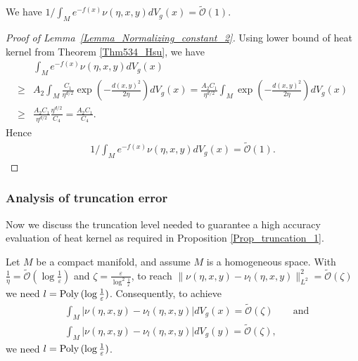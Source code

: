 \begin{lemma}\label{Lemma_Normalizing_constant_2}
    We have $1/\int_{M} e^{-f(x)}\nu(\eta, x, y) dV_{g}(x) = \tilde{\mathcal{O}}(1)$.
\end{lemma}
\begin{proof}[Proof of Lemma~\ref{Lemma_Normalizing_constant_2}]
    Using lower bound of heat kernel  from Theorem \ref{Thm534_Hsu}, we have 
    \begin{align*}
            &\int_{M} e^{-f(x)}\nu(\eta, x, y) dV_{g}(x) \\
            \ge& A_{2} \int_{M} \frac{C_{1}}{\eta^{d/2}} \exp(-\frac{d(x, y)^{2}}{2\eta}) dV_{g}(x) 
            = \frac{A_{2}C_{1}}{\eta^{d/2}} \int_{M} \exp(-\frac{d(x, y)^{2}}{2\eta}) dV_{g}(x)  \\
            \ge& \frac{A_{2}C_{1}}{\eta^{d/2}} \frac{\eta^{d/2}}{C_{4}}
            = \frac{A_{2}C_{1}}{C_{4}}.
    \end{align*}
    Hence
    \begin{align*}
        1/\int_{M} e^{-f(x)}\nu(\eta, x, y) dV_{g}(x) = \tilde{\mathcal{O}}(1).
    \end{align*}
\end{proof}

\subsubsection{Analysis of truncation error}

Now we discuss the truncation level needed to guarantee a high accuracy evaluation of heat kernel 
as required in Proposition \ref{Prop_truncation_1}.
\begin{proposition}\label{Prop_truncation_level}
    Let $M$ be a compact manifold, and assume $M$ is a homogeneous space. 
    With $\frac{1}{\eta} = \tilde{\mathcal{O}}(\log \frac{1}{\varepsilon})$ and 
    $\zeta = \frac{\varepsilon}{\log^{2} \frac{1}{\varepsilon}}$, 
    to reach $\|\nu(\eta, x, y) - \nu_{l}(\eta, x, y)\|_{L^{2}}^{2} = \tilde{\mathcal{O}}(\zeta)$
    we need $l = \operatorname{Poly\,} (\log \frac{1}{\varepsilon})$. 
    Consequently, to achieve 
    \begin{align*}
            &\int_{M} |\nu(\eta, x, y) - \nu_{l}(\eta, x, y)| dV_{g}(x) = \tilde{\mathcal{O}}(\zeta) \qquad\text{and}\\
          & \int_{M} |\nu(\eta, x, y) - \nu_{l}(\eta, x, y)| dV_{g}(y) = \tilde{\mathcal{O}}(\zeta),
    \end{align*}
    we need $l = \operatorname{Poly\,} (\log \frac{1}{\varepsilon})$. 
\end{proposition}

